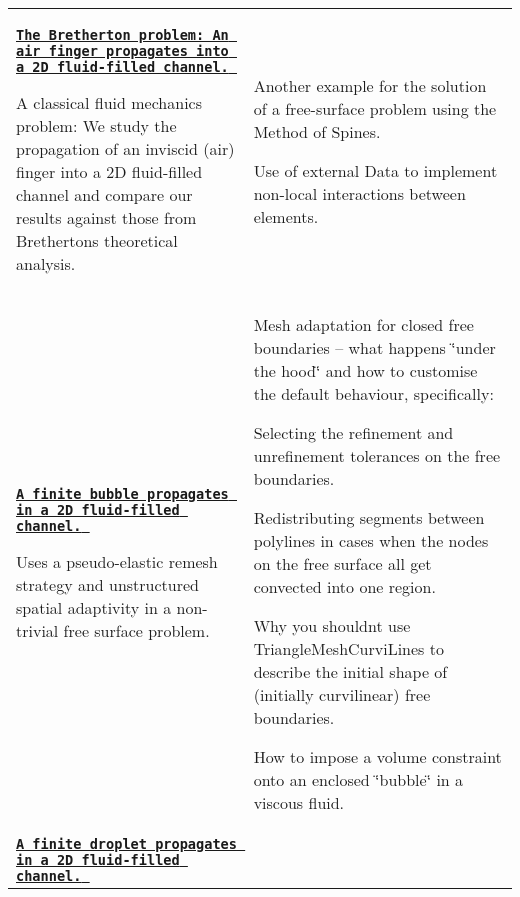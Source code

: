 \begin{longtabu} spread 0pt [c]{*{2}{|X[-1]}|}
\hline
\href{../../navier_stokes/bretherton/html/index.html}{\tt {\bfseries The Bretherton problem\+: An air finger propagates into a 2D fluid-\/filled channel.} }

A classical fluid mechanics problem\+: We study the propagation of an inviscid (air) finger into a 2D fluid-\/filled channel and compare our results against those from Bretherton\textquotesingle{}s theoretical analysis.  &
\begin{DoxyItemize}
\item Another example for the solution of a free-\/surface problem using the Method of Spines.
\item Use of external {\ttfamily Data} to implement non-\/local interactions between elements. 
\end{DoxyItemize}



\\
\href{../../navier_stokes/adaptive_bubble_in_channel/html/index.html}{\tt {\bfseries A finite bubble propagates in a 2D fluid-\/filled channel.} }

Uses a pseudo-\/elastic remesh strategy and unstructured spatial adaptivity in a non-\/trivial free surface problem.  &
\begin{DoxyItemize}
\item Mesh adaptation for closed free boundaries -- what happens \char`\"{}under
  the hood\char`\"{} and how to customise the default behaviour, specifically\+:
\begin{DoxyItemize}
\item Selecting the refinement and unrefinement tolerances on the free boundaries.
\item Redistributing segments between polylines in cases when the nodes on the free surface all get convected into one region.
\item Why you shouldn\textquotesingle{}t use {\ttfamily Triangle\+Mesh\+Curvi\+Lines} to describe the initial shape of (initially curvilinear) free boundaries.
\end{DoxyItemize}
\item How to impose a volume constraint onto an enclosed \char`\"{}bubble\char`\"{} in a viscous fluid.
\end{DoxyItemize}



\\
\href{../../navier_stokes/adaptive_droplet_in_channel/html/index.html}{\tt {\bfseries A finite droplet propagates in a 2D fluid-\/filled channel.} }


\end{longtabu}
